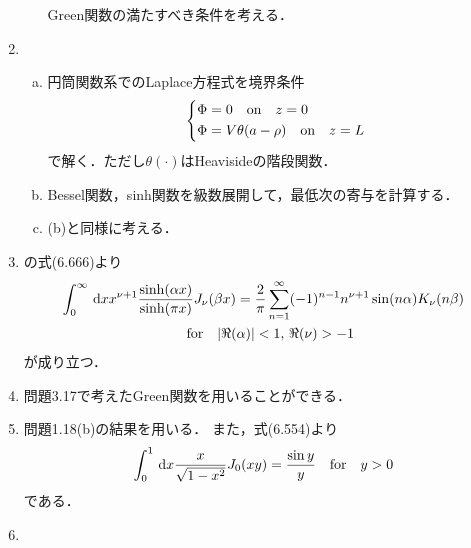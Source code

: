 \begin{enumerate}[label={\large 3.\arabic*}]
\begin{enumerate}[(a)]
        Green関数の満たすべき条件を考える．
    \end{enumerate}
  \item 
    \begin{enumerate}[(a)]%
      \item  円筒関数系でのLaplace方程式を境界条件
        \begin{gather}%
          \begin{dcases}%
            \Phi = 0\qqtext{on} z = 0\\
            \Phi = V\theta(a-\rho) \qqtext{on} z = L
          \end{dcases}%
        \end{gather}%
        で解く．ただし$\theta(\cdot)$はHeavisideの階段関数．
      \item Bessel関数，sinh関数を級数展開して，最低次の寄与を計算する．
      \item (b)と同様に考える．
    \end{enumerate}%
  \item 
    \cite{gradshteyn2014}の式(6.666)より
    \begin{multline}%
      \int_0^\infty \dl{x} x^{\nu +1} \frac{\sinh(\alpha x)}{\sinh(\pi x)} J_\nu(\beta x)
      = \frac{2}{\pi}\sum_{n=1}^\infty (-1)^{n-1} n^{\nu+1}\sin(n\alpha) K_\nu(n\beta)\\
      \qqtext{for} |\Re(\alpha)| < 1,\, \Re(\nu) > -1
    \end{multline}%
    が成り立つ．
  \item 問題3.17で考えたGreen関数を用いることができる．
  \item 問題1.18(b)の結果を用いる．
    また，\cite{gradshteyn2014}式(6.554)より
    \begin{gather}%
      \int_0^1  \dl{x} \frac{x}{\sqrt{1-x^2}} J_0(xy) = \frac{\sin y}{y} \qqtext{for} y > 0
    \end{gather}%
    である．
  \item 
\end{enumerate}
